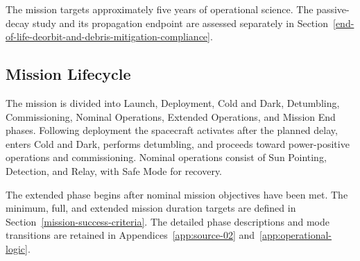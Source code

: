 The mission targets approximately five years of operational science. The passive-decay study and its propagation endpoint are assessed separately in Section~\ref{end-of-life-deorbit-and-debris-mitigation-compliance}.

\subsection{Mission Lifecycle}\label{sec:mission-lifecycle}
The mission is divided into Launch, Deployment, Cold and Dark, Detumbling, Commissioning, Nominal Operations, Extended Operations, and Mission End phases. Following deployment the spacecraft activates after the planned delay, enters Cold and Dark, performs detumbling, and proceeds toward power-positive operations and commissioning. Nominal operations consist of Sun Pointing, Detection, and Relay, with Safe Mode for recovery.

The extended phase begins after nominal mission objectives have been met. The minimum, full, and extended mission duration targets are defined in Section~\ref{mission-success-criteria}. The detailed phase descriptions and mode transitions are retained in Appendices~\ref{app:source-02} and~\ref{app:operational-logic}.
